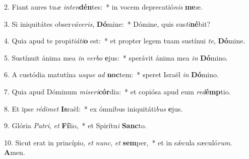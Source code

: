 2. Fiant aures tu\textit{æ} \textit{in}\textit{ten}\textbf{dén}tes:~*  in vocem deprecatió\textit{nis} \textbf{me}æ.\

3. Si iniquitátes obser\textit{vá}\textit{ve}\textit{ris}, \textbf{Dó}mine:~*  Dómine, quis sus\textit{ti}\textbf{né}bit?\

4. Quia apud te propi\textit{ti}\textit{á}\textit{ti}\textbf{o} est:~*  et propter legem tuam sustínui \textit{te}, \textbf{Dó}mine.\

5. Sustínuit ánima mea \textit{in} \textit{ver}\textit{bo} \textbf{e}jus:~*  sperávit ánima mea \textit{in} \textbf{Dó}mino.\

6. A custódia matutína \textit{us}\textit{que} \textit{ad} \textbf{noc}tem:~*  speret Israël \textit{in} \textbf{Dó}mino.\

7. Quia apud Dóminum \textit{mi}\textit{se}\textit{ri}\textbf{cór}dia:~*  et copiósa apud eum \textit{red}\textbf{émp}tio.\

8. Et ipse \textit{réd}\textit{i}\textit{met} \textbf{Is}raël:~*  ex ómnibus iniquitáti\textit{bus} \textbf{e}jus.\

9. Glória \textit{Pa}\textit{tri}, \textit{et} \textbf{Fí}lio,~*  et Spirítu\textit{i} \textbf{Sanc}to.\

10. Sicut erat in princípio, \textit{et} \textit{nunc}, \textit{et} \textbf{sem}per,~*  et in sǽcula sæculó\textit{rum}. \textbf{A}men.\

